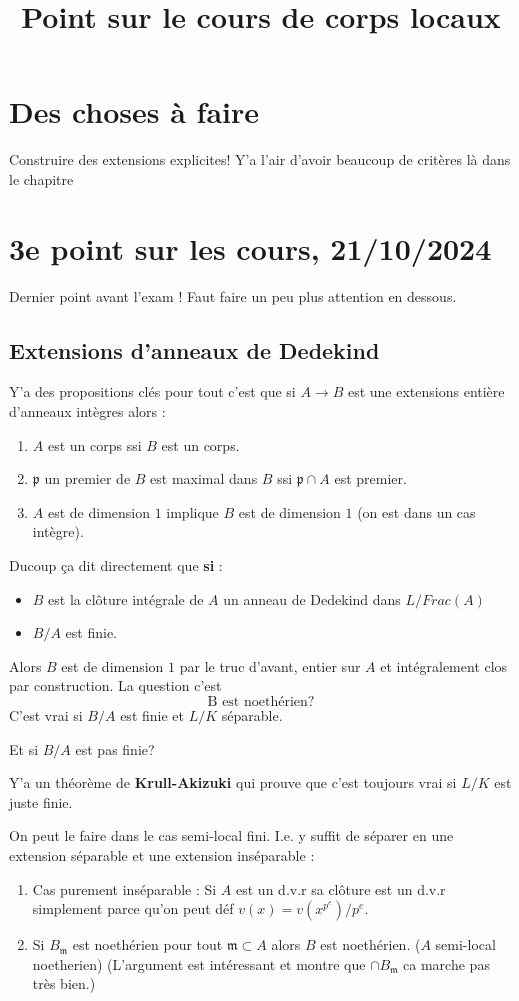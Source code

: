 \documentclass[a4paper,12pt]{book}
\title{Point sur le cours de corps locaux }
\date{}
\newcommand{\m}{\mathfrak m}
\newcommand{\p}{\mathfrak p}
\theoremstyle{plain}
\theoremstyle{definition}
\theoremstyle{remark}
\begin{document}
\maketitle
\chapter{Des choses à faire}
Construire des extensions explicites! Y'a l'air d'avoir beaucoup de 
critères là dans le chapitre

\chapter{3e point sur les cours, 21/10/2024}
Dernier point avant l'exam ! Faut faire un peu plus attention en
dessous.
\section{Extensions d'anneaux de Dedekind}
Y'a des propositions clés pour tout c'est que si $A\to B$ est une
extensions entière d'anneaux intègres alors :
\begin{enumerate}
    \item $A$ est un corps ssi $B$ est un corps.
    \item $\p$ un premier de $B$ est maximal dans $B$ ssi $\p\cap A$ 
	est premier.
    \item $A$ est de dimension $1$ implique $B$ est de dimension $1$
	(on est dans un cas intègre).
\end{enumerate}
Ducoup ça dit directement que \textbf{si} :
\begin{itemize}
    \item $B$ est la clôture intégrale de $A$
un anneau de Dedekind dans $L/Frac(A)$
    \item $B/A$ est finie.
\end{itemize}
Alors $B$ est de dimension $1$ par le truc d'avant, entier
sur $A$ et intégralement clos par construction. La question c'est 
\[\textrm{B est noethérien?}\]
C'est vrai si $B/A$ est finie et $L/K$ séparable.
\begin{center}
    Et si $B/A$ est pas finie?
\end{center}
Y'a un théorème de \textbf{Krull-Akizuki} qui prouve que c'est toujours
vrai si $L/K$ est juste finie.

On peut le faire dans le cas semi-local fini. I.e. y suffit de 
séparer en une extension séparable et une extension inséparable :
\begin{enumerate}
    \item Cas purement inséparable : Si $A$ est un d.v.r sa clôture est
	un d.v.r simplement parce qu'on peut déf $v(x) = v(x^{p^e})/p^e$.
    \item Si $B_{\m}$ est noethérien pour tout $\m\subset A$ alors
	$B$ est noethérien. ($A$ semi-local noetherien) (L'argument
	est intéressant et montre que $\cap B_{\m}$ ca marche pas très
	bien.)
\end{enumerate}
\end{document}
